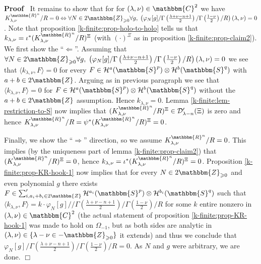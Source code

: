\documentclass{article}
\newenvironment{proof}{\noindent\textbf{Proof\ }}{\hspace*{\fill}$\Box$\medskip}
\begin{document}
\begin{proof}
  It remains to show that for for $(\lambda, \nu) \in \mathbbm{C}^2$ we have
  $K_{\lambda, \nu}^{\mathbbm{R}^n} / R = 0 \Leftrightarrow \forall N \in
  2\mathbbm{Z}_{\geqslant 0} \forall g, \; \left( \varphi_N [g] / \Gamma
  \left( \frac{\lambda + \nu - n + 1}{2} \right) / \Gamma \left( \frac{1 -
  \nu}{2} \right) / R \right) (\lambda, \nu) = 0$. Note that proposition
  \ref{k-finite:prop-holo-to-holo} tells us that $k_{\lambda, \nu} =
  \iota^{\ast} (K_{\lambda, \nu}^{\mathbbm{R}^n} / R)^{\Xi}$ (with
  $(\cdot)^{\Xi}$ as in proposition \ref{k-finite:prop-claim2}). We first show
  the ``$\Leftarrow$''. Assuming that $\forall N \in 2\mathbbm{Z}_{\geqslant
  0} \forall g, \; \left( \varphi_N [g] / \Gamma \left( \frac{\lambda + \nu -
  n + 1}{2} \right) / \Gamma \left( \frac{1 - \nu}{2} \right) / R \right)
  (\lambda, \nu) = 0$ we see that $\langle k_{\lambda, \nu}, F \rangle = 0$
  for every $F \in \mathcal{H}^a (\mathbbm{S}^p) \otimes \mathcal{H}^b
  (\mathbbm{S}^q)$ with $a + b \in 2\mathbbm{Z}$. Arguing as in previous
  paragraph we see that $\langle k_{\lambda, \nu}, F \rangle = 0$ for $F \in
  \mathcal{H}^a (\mathbbm{S}^p) \otimes \mathcal{H}^b (\mathbbm{S}^q)$ without
  the $a + b \in 2\mathbbm{Z}$ assumption. Hence $k_{\lambda, \nu} = 0$. Lemma
  \ref{k-finite:lem-restriction-to-S} now implies that $(K_{\lambda,
  \nu}^{\mathbbm{R}^n} / R)^{\Xi} \in \mathcal{D}'_{\lambda - n} (\Xi)$ is
  zero and hence $K_{\lambda, \nu}^{\mathbbm{R}^n} / R = \psi^{\ast}
  (K_{\lambda, \nu}^{\mathbbm{R}^n} / R)^{\Xi} = 0$.
  
  Finally, we show the ``$\Rightarrow$'' direction, so we assume $K_{\lambda,
  \nu}^{\mathbbm{R}^n} / R = 0$. This implies (by the uniqueness part of lemma
  \ref{k-finite:prop-claim2}) that $(K_{\lambda, \nu}^{\mathbbm{R}^n} /
  R)^{\Xi} = 0$, hence $k_{\lambda, \nu} = \iota^{\ast} (K_{\lambda,
  \nu}^{\mathbbm{R}^n} / R)^{\Xi} = 0$. Proposition
  \ref{k-finite:prop-KR-hook-1} now implies that for every $N \in
  2\mathbbm{Z}_{\geqslant 0}$ and even polynomial $g$ there exists $F \in
  \sum_{i, a_i + b_i \in 2\mathbbm{Z}}' \mathcal{H}^{a_i} (\mathbbm{S}^p)
  \otimes \mathcal{H}^{b_i} (\mathbbm{S}^q)$ such that $\langle k_{\lambda,
  \nu}^{}, F \rangle = k \cdot \varphi_N [g] / / \Gamma \left( \frac{\lambda +
  \nu - n + 1}{2} \right) / \Gamma \left( \frac{1 - \nu}{2} \right) / R$ for
  some $k$ entire nonzero in $(\lambda, \nu) \in \mathbbm{C}^2$ (the actual
  statement of proposition \ref{k-finite:prop-KR-hook-1} was made to hold on
  $\Omega_{- 1}$, but as both sides are analytic in $(\lambda, \nu) \in \{
  \lambda - \nu \in -\mathbbm{Z}_{\geqslant 0} \}$ it extends) and thus we
  conclude that $\varphi_N [g] / \Gamma \left( \frac{\lambda + \nu - n + 1}{2}
  \right) / \Gamma \left( \frac{1 - \nu}{2} \right) / R = 0$. As $N$ and $g$
  were arbitrary, we are done.
\end{proof}
\end{document}

